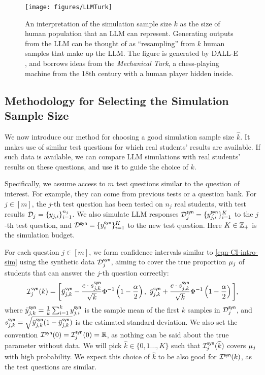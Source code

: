 \begin{figure}
\centering
\texttt{[image: figures/LLMTurk]}
\caption{An interpretation of the simulation sample size $k$ as the size of human population that an LLM can represent. Generating outputs from the LLM can be thought of as ``resampling'' from $k$ human samples that make up the LLM. The figure is generated by DALL-E \citep{RPG21}, and borrows ideas from the \emph{Mechanical Turk}, a chess-playing machine from the 18th century with a human player hidden inside.}\label{fig-LLMTurk}
\end{figure}


\subsection{Methodology for Selecting the Simulation Sample Size}\label{sec-method-1D}

We now introduce our method for choosing a good simulation sample size $\widehat{k}$. It makes use of similar test questions for which real students' results are available. If such data is available, we can compare LLM simulations with real students' results on these questions, and use it to guide the choice of $k$. 

Specifically, we assume access to $m$ test questions similar to the question of interest. For example, they can come from previous tests or a question bank. For $j\in[m]$, the $j$-th test question has been tested on $n_j$ real students, with test results $\mathcal{D}_j = \{ y_{j,i} \}_{i=1}^{n_j}$. We also simulate LLM responses $\mathcal{D}^{\mathsf{syn}}_j = \{ y^{\mathsf{syn}}_{j,i} \}_{i=1}^K$ to the $j$-th test question, and $\mathcal{D}^{\mathsf{syn}} = \{ y^{\mathsf{syn}}_{i} \}_{i=1}^K$ to the new test question. Here $K\in\mathbb{Z}_+$ is the simulation budget.

For each question $j\in[m]$, we form confidence intervals similar to \eqref{eqn-CI-intro-sim} using the synthetic data $\mathcal{D}^{\mathsf{syn}}_j$, aiming to cover the true proportion $\mu_j$ of students that can answer the $j$-th question correctly:
\begin{equation}\label{eqn-CI-intro-sim-calibrate}
\mathcal{I}^{\mathsf{syn}}_j(k) = \bigg[ \bar{y}^{\mathsf{syn}}_{j,k} - \frac{c\cdot s^{\mathsf{syn}}_{j,k}}{\sqrt{k}} \Phi^{-1}\left( 1- \frac{\alpha}{2} \right) , 
~  \bar{y}^{\mathsf{syn}}_{j,k} + \frac{c\cdot s^{\mathsf{syn}}_{j,k}}{\sqrt{k}} \Phi^{-1}\left( 1 - \frac{\alpha}{2} \right) \bigg], 
\end{equation}
where $\bar{y}^{\mathsf{syn}}_{j,k} = \frac{1}{k} \sum_{i=1}^k y^{\mathsf{syn}}_{j,i}$ is the sample mean of the first $k$ samples in $\mathcal{D}^{\mathsf{syn}}_j$, and $s^{\mathsf{syn}}_{j,k} = \sqrt{\bar{y}^{\mathsf{syn}}_{j,k} ( 1 - \bar{y}^{\mathsf{syn}}_{j,k} )}$ is the estimated standard deviation. We also set the convention $\mathcal{I}^{\mathsf{syn}}(0) = \mathcal{I}^{\mathsf{syn}}_j(0) = \mathbb{R}$, as nothing can be said about the true parameter without data. We will pick $\widehat{k}\in\{0,1...,K\}$ such that $\mathcal{I}^{\mathsf{syn}}_j(\widehat{k})$ covers $\mu_j$ with high probability. We expect this choice of $\widehat{k}$ to be also good for $\mathcal{I}^{\mathsf{syn}}(k)$, as the test questions are similar.

